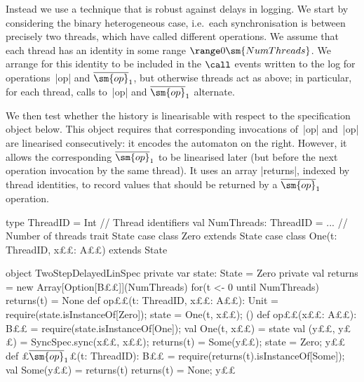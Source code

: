 Instead we use a technique that is robust against delays in logging.  We start
by considering the binary heterogeneous case, i.e.~each synchronisation is
between precisely two threads, which have called different operations.  We
assume that each thread has an identity in some range $\range 0
{\sm{NumThreads}}$.  We arrange for this identity to be included in the
$\call$ events written to the log for operations~|op| and
$\overline{\sm{op}}_1$, but otherwise threads act as above; in particular, for
each thread, calls to~|op| and $\overline{\sm{op}}_1$ alternate.

We then test whether the history is linearisable with respect to the
specification object below.  This object requires that corresponding
invocations of~|op| and~|op| are linearised consecutively: it encodes
the automaton on the right.  However, it allows
the corresponding $\overline{\sm{op}}_1$ to be linearised later (but before
the next operation invocation by the same thread).  It uses an array
|returns|, indexed by thread identities, to record values that should be
returned by a $\overline{\sm{op}}_1$ operation.
%
\begin{trivlist}
\item[]
\begin{minipage}{92mm}
\begin{scala}
type ThreadID = Int               // Thread identifiers
val NumThreads: ThreadID = ... // Number of threads
trait State
case class Zero extends State
case class One(t: ThreadID, x££: A££) extends State
\end{scala}
\end{minipage}
\hfill 
%
\begin{minipage}{37.8mm}
%
\end{minipage}%
\begin{scala}
object TwoStepDelayedLinSpec{
  private var state: State = Zero
  private val returns = new Array[Option[B££]](NumThreads)
  for(t <- 0 until NumThreads) returns(t) = None
  def op££(t: ThreadID, x££: A££): Unit = {
    require(state.isInstanceOf[Zero]); state = One(t, x££); ()
  }
  def op££(x££: A££): B££ = {
    require(state.isInstanceOf[One]); val One(t, x££) = state
    val (y££, y££) = SyncSpec.sync(x££, x££); returns(t) = Some(y££); state = Zero; y££
  }
  def £$\overline{\sm{op}}_1$£(t: ThreadID): B££ = {
    require(returns(t).isInstanceOf[Some]); val Some(y££) = returns(t)
    returns(t) = None; y££
  }
}
\end{scala}
\end{trivlist}

